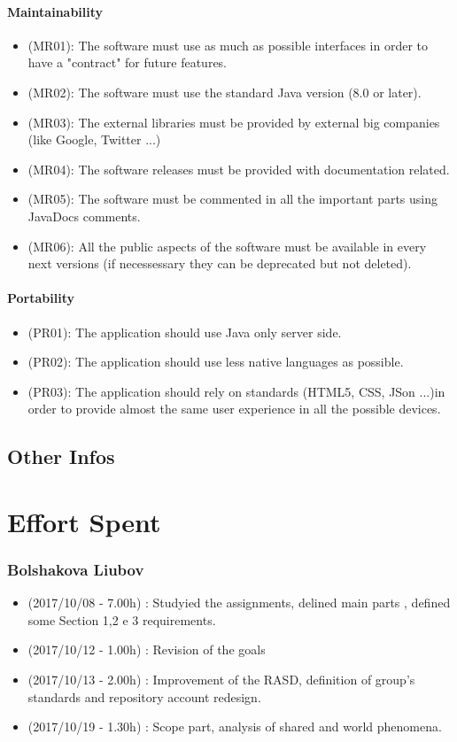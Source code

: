 \documentclass[a4paper]{book}
\begin{document}
\subsection{Maintainability}
\begin{itemize}
\item (MR01): The software must use as much as possible interfaces in order to have a "contract" for future features.
\item (MR02): The software must use the standard Java version (8.0 or later).
\item (MR03): The external libraries must be provided by external big companies (like Google, Twitter ...)
\item (MR04): The software releases must be provided with documentation related.
\item (MR05): The software must be commented in all the important parts using JavaDocs comments.
\item (MR06): All the public aspects of the software must be available in every next versions (if necessessary they can be deprecated but not deleted).
\end{itemize}

\subsection{Portability}
\begin{itemize}
\item (PR01): The application should use Java only server side.
\item (PR02): The application should use less native languages as possible.
\item (PR03): The application should rely on standards (HTML5, CSS, JSon ...)in order to provide almost the same user experience in all the possible devices.
\end{itemize}

\chapter{Other Infos}

\part{Effort Spent}

\section{Bolshakova Liubov}
\begin{itemize}
\item (2017/10/08 - 7.00h) : Studyied the assignments, delined main parts , defined some Section 1,2 e 3 requirements.
\item (2017/10/12 - 1.00h) : Revision of the goals 
\item (2017/10/13 - 2.00h) : Improvement of the RASD, definition of group's standards and repository account redesign.
\item (2017/10/19 - 1.30h) : Scope part, analysis of shared and world phenomena.
\end{itemize}
\end{document}
